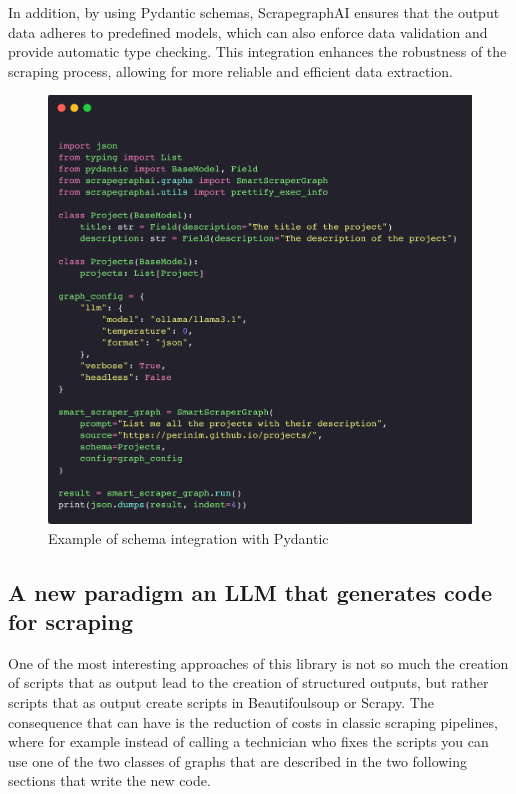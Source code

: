 In addition, by using Pydantic schemas, ScrapegraphAI ensures that the output data adheres to predefined models, which can also enforce data validation and provide automatic type checking. This integration enhances the robustness of the scraping process, allowing for more reliable and efficient data extraction.

\begin{figure}[H]
    \centering
    \includegraphics[width=1\linewidth]{Assets/schema_integration.png}
    \caption{Example of schema integration with Pydantic}
    \label{fig:enter-label}
\end{figure}


\subsection{A new paradigm an LLM that generates code for scraping}
One of the most interesting approaches of this library is not so much the creation of scripts that as output lead to the creation of structured outputs, but rather scripts that as output create scripts in Beautifoulsoup or Scrapy.
The consequence that can have is the reduction of costs in classic scraping pipelines, where for example instead of calling a technician who fixes the scripts you can use one of the two classes of graphs that are described in the two following sections that write the new code.

